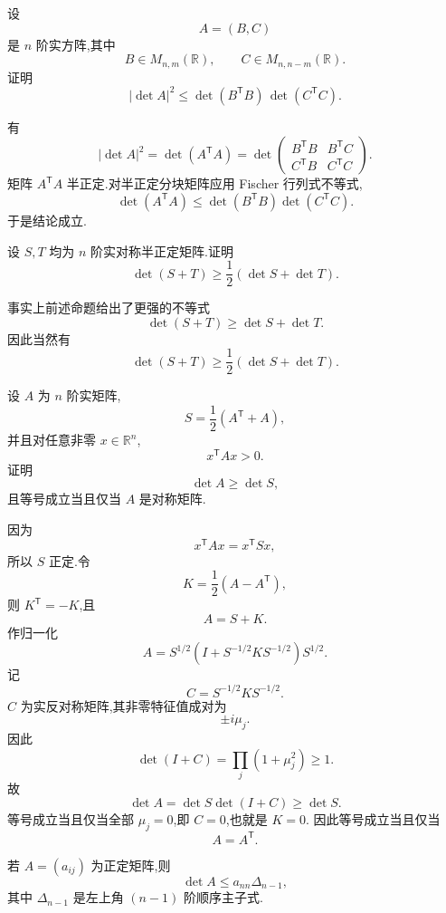 \begin{example}
设
\[
A=(B,C)
\]
是 $n$ 阶实方阵,其中
\[
B\in M_{n,m}(\mathbb{R}),
\qquad
C\in M_{n,n-m}(\mathbb{R}).
\]
证明
\[
|\det A|^2
\le
\det(B^{\mathsf T}B)\,
\det(C^{\mathsf T}C).
\]
\end{example}
\exampleblank

\begin{solution}
有
\[
|\det A|^2
=
\det(A^{\mathsf T}A)
=
\det
\begin{pmatrix}
B^{\mathsf T}B&B^{\mathsf T}C\\
C^{\mathsf T}B&C^{\mathsf T}C
\end{pmatrix}.
\]
矩阵 $A^{\mathsf T}A$ 半正定.对半正定分块矩阵应用 Fischer 行列式不等式,
\[
\det(A^{\mathsf T}A)
\le
\det(B^{\mathsf T}B)\det(C^{\mathsf T}C).
\]
于是结论成立.
\end{solution}


\begin{example}
设 $S,T$ 均为 $n$ 阶实对称半正定矩阵.证明
\[
\det(S+T)
\ge
\dfrac12
\left(\det S+\det T\right).
\]
\end{example}
\exampleblank

\begin{solution}
事实上前述命题给出了更强的不等式
\[
\det(S+T)\ge\det S+\det T.
\]
因此当然有
\[
\boxed{
\det(S+T)
\ge
\dfrac12(\det S+\det T).
}
\]
\end{solution}


\begin{example}
设 $A$ 为 $n$ 阶实矩阵,
\[
S=\dfrac12(A^{\mathsf T}+A),
\]
并且对任意非零 $x\in\mathbb{R}^n$,
\[
x^{\mathsf T}Ax>0.
\]
证明
\[
\det A\ge\det S,
\]
且等号成立当且仅当 $A$ 是对称矩阵.
\end{example}
\exampleblank

\begin{solution}
因为
\[
x^{\mathsf T}Ax
=
x^{\mathsf T}Sx,
\]
所以 $S$ 正定.令
\[
K=\dfrac12(A-A^{\mathsf T}),
\]
则 $K^{\mathsf T}=-K$,且
\[
A=S+K.
\]
作归一化
\[
A
=
S^{1/2}
\left(
I+S^{-1/2}KS^{-1/2}
\right)
S^{1/2}.
\]
记
\[
C=S^{-1/2}KS^{-1/2}.
\]
$C$ 为实反对称矩阵,其非零特征值成对为
\[
\pm i\mu_j.
\]
因此
\[
\det(I+C)
=
\prod_j(1+\mu_j^2)\ge1.
\]
故
\[
\det A
=
\det S\det(I+C)
\ge
\det S.
\]
等号成立当且仅当全部 $\mu_j=0$,即 $C=0$,也就是 $K=0$.
因此等号成立当且仅当
\[
\boxed{A=A^{\mathsf T}}.
\]
\end{solution}


\begin{lemma}[\markstar]
若 $A=(a_{ij})$ 为正定矩阵,则
\[
\det A
\le
a_{nn}\Delta_{n-1},
\]
其中 $\Delta_{n-1}$ 是左上角 $(n-1)$ 阶顺序主子式.
\end{lemma}

